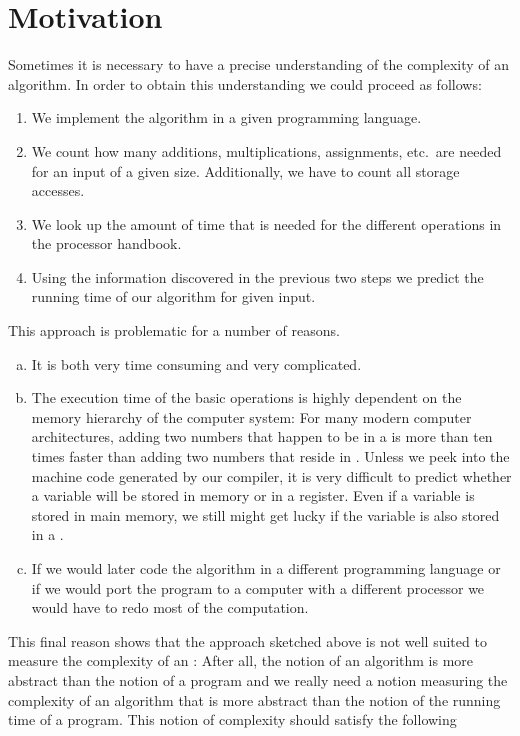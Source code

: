 \section{Motivation}
Sometimes it is necessary to have a precise understanding of the complexity of an algorithm.  
In order to obtain this understanding we could proceed as follows:  
\begin{enumerate}
\item We implement the algorithm in a given programming language.
\item We count how many additions, multiplications, assignments, etc.~are needed
      for an input of a given size.  Additionally, we have to count all storage accesses.
\item We look up the amount of time that is needed for the different operations in the processor handbook.
\item Using the information discovered in the previous two steps we predict the running
      time of our algorithm for given input.
\end{enumerate}
This approach is problematic for a number of reasons.
\begin{enumerate}[(a)]
\item It is both very time consuming and very complicated.
\item The execution time of the basic operations is highly dependent on the memory hierarchy of the
      computer system:  For many modern computer architectures, adding two numbers that happen to be
      in a  is more than ten times faster than adding two numbers that reside in
      .  Unless we peek into the machine code generated by our compiler, it is very difficult
      to predict whether a variable will be stored in memory or in a register.  Even if a variable
      is stored in main memory, we still might get lucky if the variable is also stored in a .
\item If we would later code the algorithm in a different programming language or if we would port
      the program to a computer with a different processor we would have to redo most of the
      computation. 
\end{enumerate}
This final reason shows that the approach sketched above is not well suited to measure the complexity of
an : After all, the notion of an algorithm is more abstract than the notion of a program
and we really need a notion measuring the complexity of an algorithm that is more abstract than the
notion of the running time of a program.  This notion of complexity should satisfy the following
